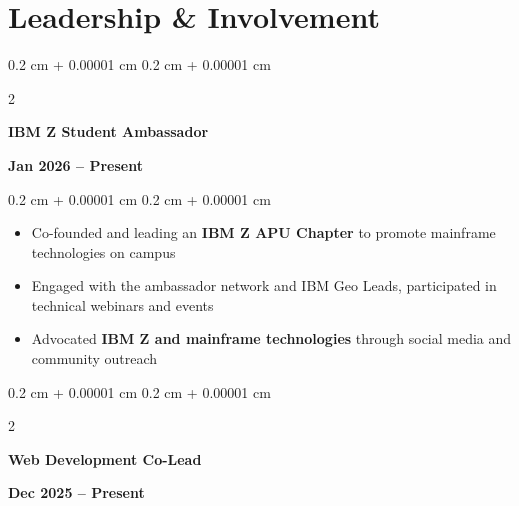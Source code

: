 \documentclass[10pt, letterpaper]{article}
\newenvironment{highlights}{
    \begin{itemize}[
        topsep=0.10 cm,
        parsep=0.10 cm,
        partopsep=0pt,
        itemsep=0pt,
        leftmargin=0.4 cm + 10pt,
        itemsep=0.1cm
    ]
}{
    \end{itemize}
} %
\newenvironment{onecolentry}{
    \begin{adjustwidth}{
        0.2 cm + 0.00001 cm
    }{
        0.2 cm + 0.00001 cm
    }
}{
    \end{adjustwidth}
} %
\newenvironment{twocolentry}[2][]{
    \onecolentry
    \def\secondColumn{#2}
    \setcolumnwidth{\fill, 4.5 cm}
    \begin{paracol}{2}
}{
    \switchcolumn \raggedleft \secondColumn
    \end{paracol}
    \endonecolentry
} %
\begin{document}
    \vspace{0.20 cm}

    \section{Leadership \& Involvement}
        \begin{twocolentry}
            {\textbf{Jan 2026 – Present}}
            {\textbf{IBM Z Student Ambassador} \\ }
        \end{twocolentry}
        
        \vspace{0.10 cm}
        \begin{onecolentry}
        \begin{highlights}
            \item Co-founded and leading an \textbf{IBM Z APU Chapter} to promote mainframe technologies on campus
            
            \item Engaged with the ambassador network and IBM Geo Leads, participated in technical webinars and events
            
            \item Advocated \textbf{IBM Z and mainframe technologies} through social media and community outreach
        \end{highlights}
        \end{onecolentry}
            

        \vspace{0.30 cm}
        
        \begin{twocolentry}
                {\textbf{Dec 2025 – Present}}
                {\textbf{Web Development Co-Lead}  \\ }
            \end{twocolentry}
            
\end{document}
